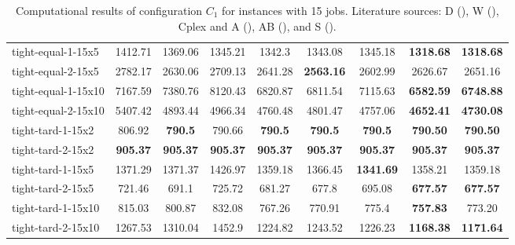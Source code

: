 \begin{table}[ht]
{\begin{tabular}{lcccccccc}
tight-equal-1-15x5 & 1412.71 & 1369.06 & 1345.21 & 1342.3 & 1343.08 & 1345.18 & \textbf{1318.68} & \textbf{1318.68} \\
tight-equal-2-15x5 & 2782.17 & 2630.06 & 2709.13 & 2641.28 & \textbf{2563.16} & 2602.99 & 2626.67 & 2651.16 \\
tight-equal-1-15x10 & 7167.59 & 7380.76 & 8120.43 & 6820.87 & 6811.54 & 7115.63 & \textbf{6582.59} & \textbf{6748.88} \\
tight-equal-2-15x10 & 5407.42 & 4893.44 & 4966.34 & 4760.48 & 4801.47 & 4757.06 & \textbf{4652.41} & \textbf{4730.08} \\
tight-tard-1-15x2 & 806.92 & \textbf{790.5} & 790.66 & \textbf{790.5} & \textbf{790.5} & \textbf{790.5} & \textbf{790.50} & \textbf{790.50} \\
tight-tard-2-15x2 & \textbf{905.37} & \textbf{905.37} & \textbf{905.37} & \textbf{905.37} & \textbf{905.37} & \textbf{905.37} & \textbf{905.37} & \textbf{905.37} \\
tight-tard-1-15x5 & 1371.29 & 1371.37 & 1426.97 & 1359.18 & 1366.45 & \textbf{1341.69} & 1358.21 & 1359.18 \\
tight-tard-2-15x5 & 721.46 & 691.1 & 725.72 & 681.27 & 677.8 & 695.08 & \textbf{677.57} & \textbf{677.57} \\
tight-tard-1-15x10 & 815.03 & 800.87 & 832.08 & 767.26 & 770.91 & 775.4 & \textbf{757.83} & 773.20 \\
tight-tard-2-15x10 & 1267.53 & 1310.04 & 1452.9 & 1224.82 & 1243.52 & 1226.23 & \textbf{1168.38} & \textbf{1171.64} \\
\hline
\end{tabular}
}
\caption{Computational results of configuration $C_1$ for instances with 15 jobs. Literature sources: D (\citet{dos2010combination}), W (\citet{wang2014variable}), Cplex and A (\citet{ahmadian2021meta}), AB (\citet{abderrazzak2022adaptive}), and S (\citet{sabri2023reinforcement}).}
\label{tab:results_15}
\end{table}
